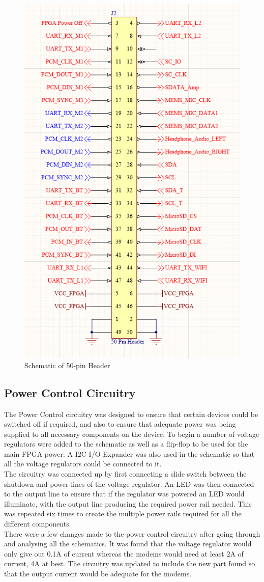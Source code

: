\begin{figure}
	\includegraphics[width=0.5\linewidth]{Figures/50pin_header.png}\centering
	\caption{Schematic of 50-pin Header}
	\label{fig:header}
\end{figure}

\subsection{Power Control Circuitry}
\label{chap:batt}
	The Power Control circuitry was designed to ensure that certain devices could be switched off if required, and also to ensure that adequate power was being supplied to all necessary components on the device. 
To begin a number of voltage regulators were added to the schematic as well as a flip-flop to be used for the main FPGA power. 
A I2C I/O Expander was also used in the schematic so that all the voltage regulators could be connected to it.\\

	The circuitry was connected up by first connecting a slide switch between the shutdown and power lines of the voltage regulator. 
An LED was then connected to the output line to ensure that if the regulator was powered an LED would illuminate, with the output line producing the required power rail needed. 
This was repeated six times to create the multiple power rails required for all the different components.\\

	There were a few changes made to the power control circuitry after going through and analysing all the schematics. 
It was found that the voltage regulator would only give out 0.1A of current whereas the modems would need at least 2A of current, 4A at best. 
The circuitry was updated to include the new part found so that the output current would be adequate for the modems. \\

